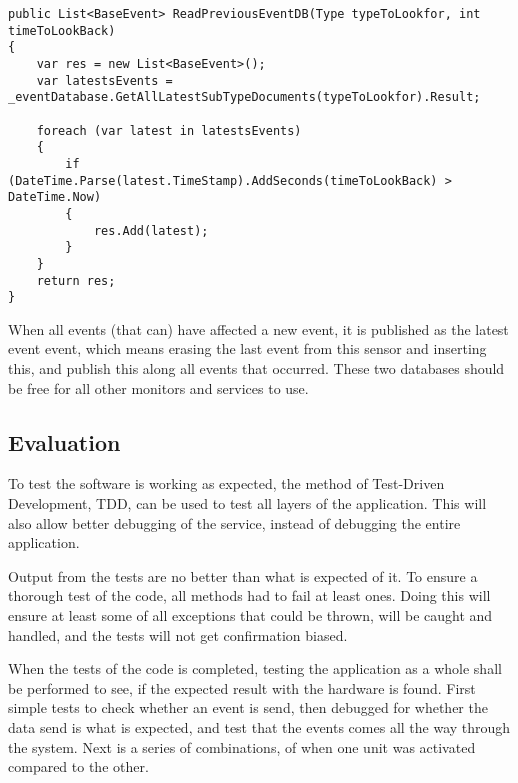 \begin{lstlisting}[caption=Events within a given time period lookup, style=Code-C++, label=lst:Time]
public List<BaseEvent> ReadPreviousEventDB(Type typeToLookfor, int timeToLookBack)
{
	var res = new List<BaseEvent>();
	var latestsEvents = _eventDatabase.GetAllLatestSubTypeDocuments(typeToLookfor).Result;

	foreach (var latest in latestsEvents)
	{
		if (DateTime.Parse(latest.TimeStamp).AddSeconds(timeToLookBack) > DateTime.Now)
		{
			res.Add(latest);
		}
	}
	return res;
}
\end{lstlisting}

When all events (that can) have affected a new event, it is published as the latest event event, which means erasing the last event from this sensor and inserting this, and publish this along all events that occurred.
These two databases should be free for all other monitors and services to use.

\subsection{Evaluation}

To test the software is working as expected, the method of Test-Driven Development, TDD, can be used to test all layers of the application.
This will also allow better debugging of the service, instead of debugging the entire application.

Output from the tests are no better than what is expected of it.
To ensure a thorough test of the code, all methods had to fail at least ones. 
Doing this will ensure at least some of all exceptions that could be thrown, will be caught and handled, and the tests will not get confirmation biased\cite{LessWrongBias}. 

When the tests of the code is completed, testing the application as a whole shall be performed to see, if the expected result with the hardware is found.
First simple tests to check whether an event is send, then debugged for whether the data send is what is expected, and test that the events comes all the way through the system.
Next is a series of combinations, of when one unit was activated compared to the other.

